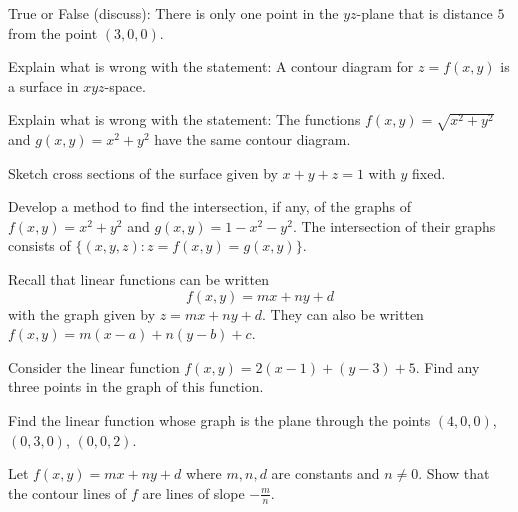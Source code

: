 \documentclass[12pt,letterpaper,noanswers]{exam}
\begin{document}
\begin{questions}
\item True or False (discuss): There is only one point in the $yz$-plane that is distance $5$ from the point $(3,0,0)$.
\item Explain what is wrong with the statement: A contour diagram for $z = f(x,y)$ is a surface in $xyz$-space.
\item Explain what is wrong with the statement: The functions $f(x,y) = \sqrt{x^2+y^2}$ and $g(x,y) = x^2+y^2$ have the same contour diagram.

\item Sketch cross sections of the surface given by $x+y+z = 1$ with $y$ fixed.
\item Develop a method to find the intersection, if any, of the graphs of $f(x,y) = x^2+y^2$ and $g(x,y) = 1-x^2-y^2$.  The intersection of their graphs consists of $\{(x,y,z): z = f(x,y) = g(x,y)\}$.

\item Recall that linear functions can be written \[f(x,y) = mx + ny + d\] with the graph given by $z = mx + ny + d$.  They can also be written $f(x,y) = m (x-a) + n (y-b) + c$.

Consider the linear function $f(x,y) = 2(x-1) + (y-3) + 5$.  Find any three points in the graph of this function.

\item Find the linear function whose graph is the plane through the points $(4,0,0)$, $(0,3,0)$, $(0,0,2)$.

\item Let $f(x,y) = mx +ny + d$ where $m,n,d$ are constants and $n\neq 0$.  Show that the contour lines of $f$ are lines of slope $-\frac{m}{n}$.

\end{questions}
\end{document}
